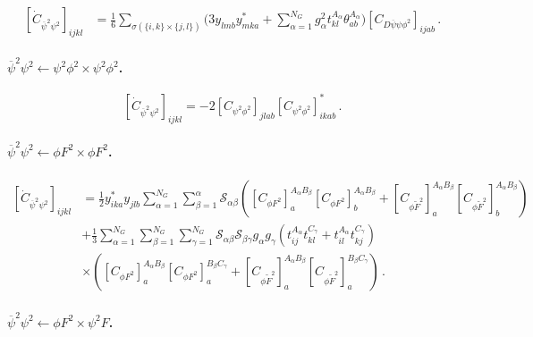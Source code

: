 \begin{align}
    \left[\dot C_{\overline \psi^2 \psi^2}\right]_{ijkl} &= \frac{1}{6}\sum_{\sigma(\{i,k\}\times \{j,l\})}
    \Bigg(
    3y_{lmb}y^*_{mka}+\sum_{\alpha=1}^{N_G} g_\alpha^2 t^{A_\alpha}_{kl}\theta^{A_\alpha}_{ab}
    \Bigg)
    \left[C_{D \overline \psi \psi \phi^2}\right]_{ijab}
    \,.
\end{align}

\paragraph{$\overline \psi^2 \psi^2 \leftarrow \psi^2 \phi^2 \times \psi^2 \phi^2$.}

\begin{equation}
    \left[\dot C_{\overline \psi^2 \psi^2}\right]_{ijkl} =
    -2 \left[C_{\psi^2\phi^2}\right]_{jlab} \left[C_{\psi^2\phi^2}\right]_{ikab}^*\,.
\end{equation}

\paragraph{$\overline \psi^2 \psi^2 \leftarrow \phi F^2 \times \phi F^2$.}

\begin{align}
    \left[\dot C_{\overline \psi^2 \psi^2}\right]_{ijkl} &= \frac{1}{2}y^*_{ika}y_{jlb} \sum_{\alpha=1}^{N_G}\sum_{\beta=1}^\alpha \mathcal S_{\alpha \beta} \left(
    \left[C_{\phi F^2}\right]^{A_\alpha B_\beta}_a
    \left[C_{\phi F^2}\right]^{A_\alpha B_\beta}_b
    +
    \left[C_{\phi \widetilde F^2}\right]^{A_\alpha B_\beta}_a
    \left[C_{\phi \widetilde F^2}\right]^{A_\alpha B_\beta}_b
    \right) \nonumber \\
    &+ \frac{1}{3}\sum_{\alpha=1}^{N_G}\sum_{\beta=1}^{N_G}\sum_{\gamma=1}^{N_G}
    \mathcal S_{\alpha\beta}\mathcal S_{\beta\gamma} g_\alpha g_\gamma \left(t^{A_\alpha}_{ij} t^{C_\gamma}_{kl} + t^{A_\alpha}_{il} t^{C_\gamma}_{kj}\right)\nonumber \\
    &\times
    \left(
    \left[C_{\phi F^2}\right]^{A_\alpha B_\beta}_a
    \left[C_{\phi F^2}\right]^{ B_\beta C_\gamma}_a
    +
    \left[C_{\phi \widetilde F^2}\right]^{A_\alpha B_\beta}_a
    \left[C_{\phi \widetilde F^2}\right]^{ B_\beta C_\gamma}_a
    \right)\,.
\end{align}

\paragraph{$\overline \psi^2 \psi^2 \leftarrow \phi F^2 \times \psi^2 F$.}

